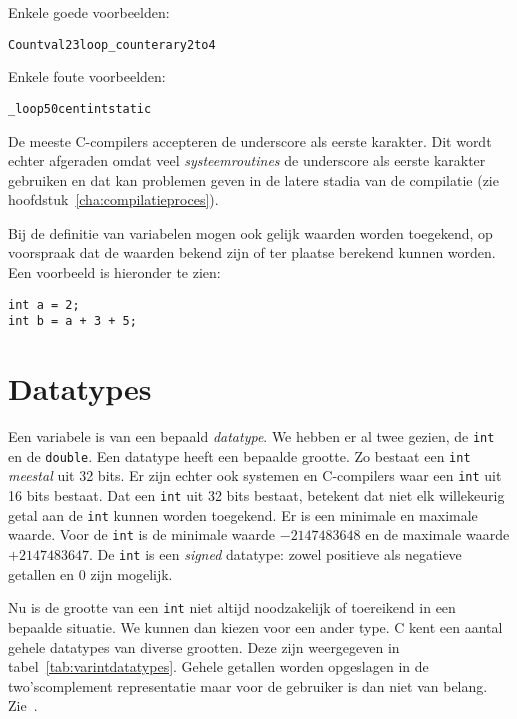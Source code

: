 Enkele goede voorbeelden:

\hspace*{1em}\texttt{Count}\quad\texttt{val23}\quad\texttt{loop\_counter}\quad\texttt{ary2to4}

Enkele foute voorbeelden:

\hspace*{1em}\texttt{\_loop}\quad\texttt{50cent}\quad\texttt{int}\quad\texttt{static}

De meeste C-compilers accepteren de underscore als eerste karakter. Dit wordt echter afgeraden omdat veel \textsl{systeemroutines} de underscore als eerste karakter gebruiken en dat kan problemen geven in de latere stadia van de compilatie (zie hoofdstuk~\ref{cha:compilatieproces}).

Bij de definitie van variabelen mogen ook gelijk waarden worden toegekend, op voorspraak dat de waarden bekend zijn of ter plaatse berekend kunnen worden. Een voorbeeld is hieronder te zien:

\hspace*{1em}\texttt{int a = 2;}\\
\hspace*{1em}\texttt{int b = a + 3 + 5;}


\section{Datatypes}
Een variabele is van een bepaald \textsl{datatype}. We hebben er al twee gezien, de \texttt{int} en de \texttt{double}. Een datatype heeft een bepaalde grootte. Zo bestaat een \texttt{int} \textsl{meestal} uit 32 bits. Er zijn echter ook systemen en C-compilers waar een \texttt{int} uit 16 bits bestaat. Dat een \texttt{int} uit 32 bits bestaat, betekent dat niet elk willekeurig getal aan de \texttt{int} kunnen worden toegekend. Er is een minimale en maximale waarde. Voor de \texttt{int} is de minimale waarde $-2147483648$ en de maximale waarde $+2147483647$. De \texttt{int} is een \textsl{signed} datatype: zowel positieve als negatieve getallen en 0 zijn mogelijk.

Nu is de grootte van een \texttt{int} niet altijd noodzakelijk of toereikend in een bepaalde situatie. We kunnen dan kiezen voor een ander type. C kent een aantal gehele datatypes van diverse grootten. Deze zijn weergegeven in tabel~\ref{tab:varintdatatypes}. Gehele getallen worden opgeslagen in de two'scomplement representatie maar voor de gebruiker is dan niet van belang. Zie~\cite{opdenbrouw2020}.

